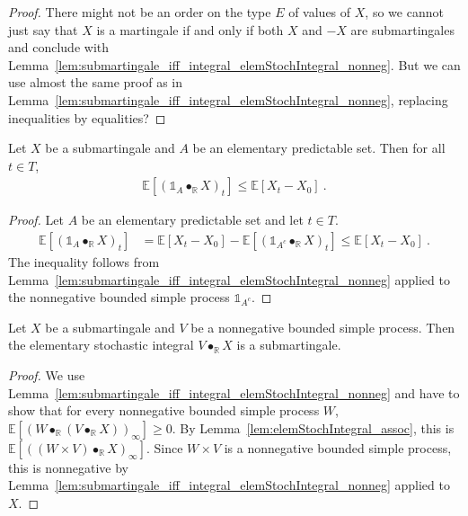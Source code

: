 \begin{proof}
There might not be an order on the type $E$ of values of $X$, so we cannot just say that $X$ is a martingale if and only if both $X$ and $-X$ are submartingales and conclude with Lemma~\ref{lem:submartingale_iff_integral_elemStochIntegral_nonneg}.
But we can use almost the same proof as in Lemma~\ref{lem:submartingale_iff_integral_elemStochIntegral_nonneg}, replacing inequalities by equalities?
\end{proof}


\begin{corollary}\label{cor:Submartingale.integral_elemStochIntegral_le}
Let $X$ be a submartingale and $A$ be an elementary predictable set.
Then for all $t \in T$,
\begin{align*}
  \mathbb{E}[(\mathbb{1}_A \bullet_{\mathbb{R}} X)_t] \le \mathbb{E}[X_t - X_0]
  \: .
\end{align*}
\end{corollary}

\begin{proof}
Let $A$ be an elementary predictable set and let $t \in T$.
\begin{align*}
  \mathbb{E}[(\mathbb{1}_A \bullet_{\mathbb{R}} X)_t]
  &= \mathbb{E}[X_t - X_0] - \mathbb{E}[(\mathbb{1}_{A^c} \bullet_{\mathbb{R}} X)_t]
  \le \mathbb{E}[X_t - X_0]
  \: .
\end{align*}
The inequality follows from Lemma~\ref{lem:submartingale_iff_integral_elemStochIntegral_nonneg} applied to the nonnegative bounded simple process $\mathbb{1}_{A^c}$.
\end{proof}


\begin{lemma}\label{lem:Submartingale.elemStochIntegral}
Let $X$ be a submartingale and $V$ be a nonnegative bounded simple process.
Then the elementary stochastic integral $V \bullet_{\mathbb{R}} X$ is a submartingale.
\end{lemma}

\begin{proof}
We use Lemma~\ref{lem:submartingale_iff_integral_elemStochIntegral_nonneg} and have to show that for every nonnegative bounded simple process $W$, $\mathbb{E}[(W \bullet_{\mathbb{R}} (V \bullet_{\mathbb{R}} X))_\infty] \ge 0$.
By Lemma~\ref{lem:elemStochIntegral_assoc}, this is $\mathbb{E}[((W \times V) \bullet_{\mathbb{R}} X)_\infty]$.
Since $W \times V$ is a nonnegative bounded simple process, this is nonnegative by Lemma~\ref{lem:submartingale_iff_integral_elemStochIntegral_nonneg} applied to $X$.
\end{proof}


